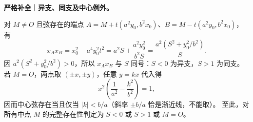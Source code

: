 \clearpage
\begin{proofbox}
\textbf{严格补全｜异支、同支及中心例外。}
\begin{center}\end{center}
对 $M\ne O$ 且弦存在的端点 $A=M+t(a^2y_0,b^2x_0)$、$B=M-t(a^2y_0,b^2x_0)$，有
\[
x_Ax_B=x_0^2-a^4y_0^2t^2
=a^2S+\frac{a^2y_0^2}{b^2S}
=\frac{a^2(S^2+y_0^2/b^2)}{S}.
\]
因 $a^2(S^2+y_0^2/b^2)>0$，所以 $x_Ax_B$ 与 $S$ 同号：$S<0$ 为异支，$S>1$ 为同支。
若 $M=O$，两点取 $(\pm x,\pm y)$，任意 $y=kx$ 代入得
\[
x^2\left(\frac1{a^2}-\frac{k^2}{b^2}\right)=1,
\]
因而中心弦存在当且仅当 $|k|<b/a$（斜率 $\pm b/a$ 恰是渐近线，不能取）。
至此，对所有中点 $M$ 的完整存在性判定为 $S<0$ 或 $S>1$ 或 $M=O$。
\end{proofbox}
